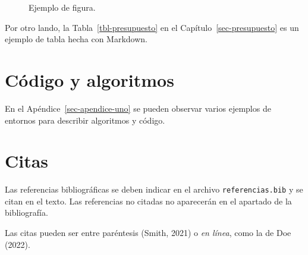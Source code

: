 \documentclass[
  letterpaper,
  DIV=11,
  numbers=noendperiod]{scrreprt}
\begin{document}
\begin{figure}[htbp]


\caption{\label{fig-introduccion}Ejemplo de figura.}

\end{figure}%

Por otro lando, la Tabla~\ref{tbl-presupuesto} en el
Capítulo~\ref{sec-presupuesto} es un ejemplo de tabla hecha con
Markdown.

\section{Código y algoritmos}\label{cuxf3digo-y-algoritmos}

\noindent En el Apéndice~\ref{sec-apendice-uno} se pueden observar
varios ejemplos de entornos para describir algoritmos y código.

\section{Citas}\label{citas}

\noindent Las referencias bibliográficas se deben indicar en el archivo
\texttt{referencias.bib} y se citan en el texto. Las referencias no
citadas no aparecerán en el apartado de la bibliografía.

Las citas pueden ser entre paréntesis (Smith, 2021) o \emph{en línea},
como la de Doe (2022).
\end{document}
